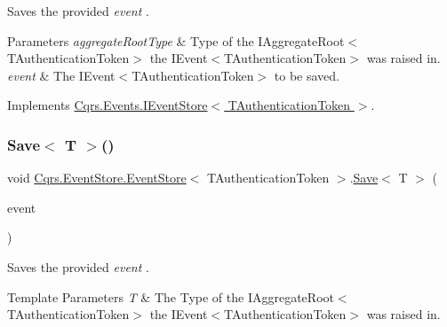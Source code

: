 Saves the provided {\itshape event} . 


\begin{DoxyParams}{Parameters}
{\em aggregate\+Root\+Type} & Type of the I\+Aggregate\+Root$<$\+T\+Authentication\+Token$>$ the I\+Event$<$\+T\+Authentication\+Token$>$ was raised in.\\
\hline
{\em event} & The I\+Event$<$\+T\+Authentication\+Token$>$ to be saved.\\
\hline
\end{DoxyParams}


Implements \hyperlink{interfaceCqrs_1_1Events_1_1IEventStore_a81fb586703e7c6dea6b23d9a95f3887a_a81fb586703e7c6dea6b23d9a95f3887a}{Cqrs.\+Events.\+I\+Event\+Store$<$ T\+Authentication\+Token $>$}.

\mbox{\label{classCqrs_1_1EventStore_1_1EventStore_a7261e5b74f55ef7afd23144c155ba116_a7261e5b74f55ef7afd23144c155ba116}} 
\subsubsection{\texorpdfstring{Save$<$ T $>$()}{Save< T >()}}
{\footnotesize\ttfamily void \hyperlink{classCqrs_1_1EventStore_1_1EventStore}{Cqrs.\+Event\+Store.\+Event\+Store}$<$ T\+Authentication\+Token $>$.\hyperlink{classCqrs_1_1EventStore_1_1EventStore_adce33037e2a3eb81cfccded42ba2ed35_adce33037e2a3eb81cfccded42ba2ed35}{Save}$<$ T $>$ (\begin{DoxyParamCaption}\item[{\hyperlink{interfaceCqrs_1_1Events_1_1IEvent}{I\+Event}$<$ T\+Authentication\+Token $>$ @}]{event }\end{DoxyParamCaption})}



Saves the provided {\itshape event} . 


\begin{DoxyTemplParams}{Template Parameters}
{\em T} & The Type of the I\+Aggregate\+Root$<$\+T\+Authentication\+Token$>$ the I\+Event$<$\+T\+Authentication\+Token$>$ was raised in.\\
\hline
\end{DoxyTemplParams}

